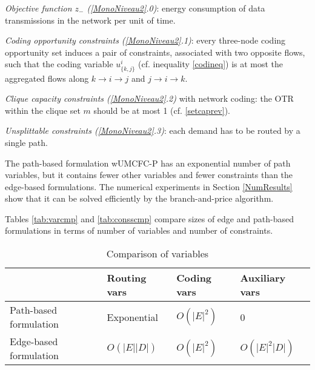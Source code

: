 \textit{Objective function \(z_{-}\)  (\ref{MonoNiveau2}.0)}: energy consumption of data transmissions in the network per unit of time.

\textit{Coding opportunity constraints (\ref{MonoNiveau2}.1)}: every three-node coding opportunity set induces a pair of constraints, associated with two opposite flows, such that the coding variable \(u^i_{\{k,j\}}\) (cf. inequality \eqref{codineq}) is at most the aggregated flows along \(k \to i \to j\) and  \(j \to i \to k\).

\textit{Clique capacity constraints (\ref{MonoNiveau2}.2)} with network coding: the OTR within the clique set \(m\) should be at most 1 (cf. \eqref{setcaprev}).

\textit{Unsplittable constraints (\ref{MonoNiveau2}.3)}: each demand has to be routed by a single path.

The path-based formulation wUMCFC-P has an exponential number of path variables, but it contains fewer other variables and fewer constraints than the edge-based formulations.
The numerical experiments in Section \ref{NumResults} show that it can be solved efficiently by the branch-and-price algorithm.

Tables \eqref{tab:varcmp} and  \eqref{tab:consscmp} compare sizes of edge and path-based formulations in terms of number of variables and number of constraints.

\begin{table}
  \centering
  \caption{Comparison of variables}
    \begin{tabular}{llll}
    \toprule
          & \multicolumn{1}{l}{Routing vars} & \multicolumn{1}{l}{Coding vars} & \multicolumn{1}{l}{Auxiliary vars} \\
    \midrule
    Path-based formulation &   Exponential    &    \(O(|E|^2)\)    & 0  \\
     \midrule
    Edge-based formulation &     \(O(|E||D|)\)     &   \(O(|E|^2)\)    &  \(O(|E|^2|D|)\) \\
    \bottomrule
    \end{tabular}%
  \label{tab:varcmp}%
\end{table}%
\begin{table}\label{table2}
  \centering
   \caption{Comparison of constraints}
  \label{tab:consscmp}%
\end{table}%


